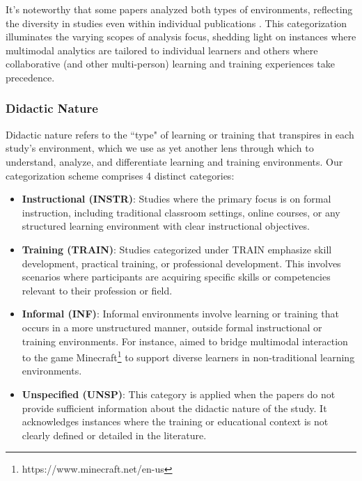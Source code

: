 \documentclass[manuscript,screen,review]{acmart}
\begin{document}
It's noteworthy that some papers analyzed both types of environments, reflecting the diversity in studies even within individual publications \cite{1326191931, 3637456466}. This categorization illuminates the varying scopes of analysis focus, shedding light on instances where multimodal analytics are tailored to individual learners and others where collaborative (and other multi-person) learning and training experiences take precedence.

\subsubsection{Didactic Nature} \label{subsec:didactic_nature}

Didactic nature refers to the ``type" of learning or training that transpires in each study's environment, which we use as yet another lens through which to understand, analyze, and differentiate learning and training environments. Our categorization scheme comprises 4 distinct categories:

\begin{itemize}
    \item \textbf{Instructional (INSTR)}: Studies where the primary focus is on formal instruction, including traditional classroom settings, online courses, or any structured learning environment with clear instructional objectives.

    \item \textbf{Training (TRAIN)}: Studies categorized under TRAIN emphasize skill development, practical training, or professional development. This involves scenarios where participants are acquiring specific skills or competencies relevant to their profession or field.
    
    \item \textbf{Informal (INF)}: Informal environments involve learning or training that occurs in a more unstructured manner, outside formal instructional or training environments. For instance, \citet{666050348} aimed to bridge multimodal interaction to the game Minecraft\footnote{https://www.minecraft.net/en-us} to support diverse learners in non-traditional learning environments. 
    
    \item \textbf{Unspecified (UNSP)}: This category is applied when the papers do not provide sufficient information about the didactic nature of the study. It acknowledges instances where the training or educational context is not clearly defined or detailed in the literature.
\end{itemize}
\end{document}
